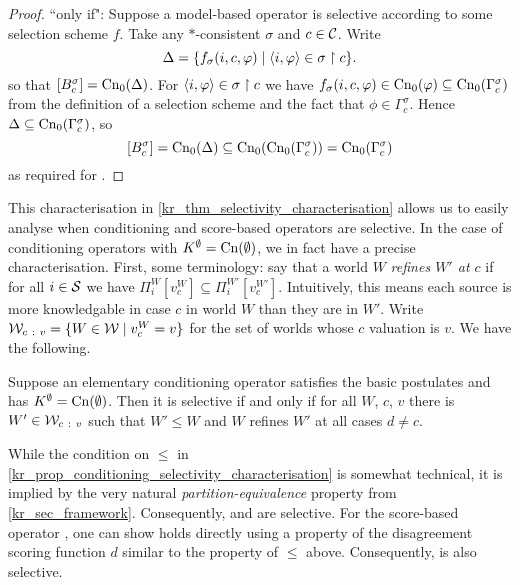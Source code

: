 \begin{proof}
    ``only if": Suppose a model-based operator is selective according to some
    selection scheme $f$. Take any $\ast$-consistent $\sigma$ and $c \in \mathcal{C}$.
    Write
    \[
        \Delta = \{
            f_\sigma(i, c, \varphi)
            \mid
            \langle {i, \varphi} \rangle \in \sigma \upharpoonright c
        \}.
    \]
    so that $\left[{B^\sigma_c}\right] = \operatorname{Cn}_0(\Delta)$. For $\langle {i, \varphi} \rangle \in
    \sigma \upharpoonright c$ we have $f_\sigma(i, c, \varphi) \in \operatorname{Cn}_0(\varphi) \subseteq
    \operatorname{Cn}_0(\Gamma^\sigma_c)$ from the definition of a selection scheme and the
    fact that $\phi \in \Gamma^\sigma_c$. Hence $\Delta \subseteq
    \operatorname{Cn}_0(\Gamma^\sigma_c)$, so
    \[
        \left[{B^\sigma_c}\right]
        = \operatorname{Cn}_0(\Delta)
        \subseteq \operatorname{Cn}_0(\operatorname{Cn}_0(\Gamma^\sigma_c))
        = \operatorname{Cn}_0(\Gamma^\sigma_c)
    \]
    as required for \boundedness{}.
\end{proof}


This characterisation in \cref{kr_thm_selectivity_characterisation} allows us to
easily analyse when conditioning and score-based operators are selective. In
the case of conditioning operators with $K^\emptyset = \operatorname{Cn}(\emptyset)$, we in
fact have a precise characterisation. First, some terminology: say that a world
$W$ \emph{refines $W'$ at $c$} if for all $i \in \mathcal{S}$ we have $\Pi^W_i[v^W_c]
\subseteq \Pi^{W'}_i[v^{W'}_c]$. Intuitively, this means each source is more
knowledgable in case $c$ in world $W$ than they are in $W'$. Write $\mathcal{W}_{c\ :\
v} = \{W \in \mathcal{W} \mid v^W_c = v\}$ for the set of worlds whose $c$ valuation is
$v$. We have the following.

\begin{proposition}
    \label{kr_prop_conditioning_selectivity_characterisation}
    Suppose an elementary conditioning operator satisfies the basic postulates
    and has $K^\emptyset = \operatorname{Cn}(\emptyset)$. Then it is selective if and only if
    for all $W$, $c$, $v$ there is $W' \in \mathcal{W}_{c\ :\ v}$ such that $W' \le W$
    and $W$ refines $W'$ at all cases $d \ne c$.
\end{proposition}

While the condition on $\le$ in
\cref{kr_prop_conditioning_selectivity_characterisation} is somewhat technical, it
is implied by the very natural \emph{partition-equivalence} property from
\cref{kr_sec_framework}. Consequently, \varbasedcond{} and \partbasedcond{} are
selective. For the score-based operator \scorebasedop{}, one can show
\boundedness{} holds directly using a property of the disagreement scoring
function $d$ similar to the property of $\le$ above. Consequently,
\scorebasedop{} is also selective.

